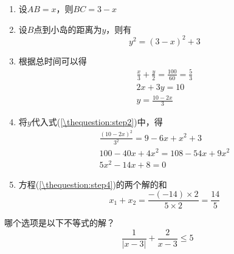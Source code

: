 \documentclass[answers]{exam}
\begin{document}
\begin{questions}
\begin{figure}[ht]
		\caption{\thequestion}
	\end{figure}

	\begin{solution}
		\begin{enumerate}
			\item 设$AB=x$，则$BC=3-x$
			\item 设$B$点到小岛的距离为$y$，则有
			      \begin{equation*}
				      y^2 = (3-x)^2 + 3 \label{\thequestion:step2}
			      \end{equation*}
			\item 根据总时间可以得
			      \begin{gather*}
				      \frac{x}{3} + \frac{y}{2} = \frac{100}{60} = \frac{5}{3}\\
				      2x + 3y = 10 \\
				      y = \frac{10 - 2x}{3}
			      \end{gather*}
			\item 将$y$代入式(\ref{\thequestion:step2})中，得
			      \begin{gather*}
				      \frac{(10-2x)^2}{3^2} = 9 - 6x + x^2 + 3 \\
				      100 -40x + 4x^2 = 108 - 54x + 9x^2 \\
				      5x^2 -14x + 8 = 0 \label{\thequestion:step4}
			      \end{gather*}
			\item 方程(\ref{\thequestion:step4})的两个解的和
			      \begin{equation*}
				      x_1 + x_2 = \frac{-(-14) \times 2}{5 \times 2} = \frac{14}{5}
			      \end{equation*}
		\end{enumerate}
	\end{solution}

	\question 哪个选项是以下不等式的解？
	\begin{equation*}
		\dfrac{1}{|x-3|} + \dfrac{2}{x-3} \le 5
	\end{equation*}


\end{questions}
\end{document}
